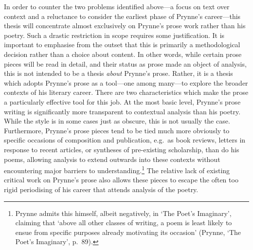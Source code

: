 \documentclass[]{article}
\begin{document}
In order to counter the two problems identified above---a focus on text
over context and a reluctance to consider the earliest phase of Prynne's
career---this thesis will concentrate almost exclusively on Prynne's
prose work rather than his poetry. Such a drastic restriction in scope
requires some justification. It is important to emphasise from the
outset that this is primarily a methodological decision rather than a
choice about content. In other words, while certain prose pieces will be
read in detail, and their status as prose made an object of analysis,
this is not intended to be a thesis \emph{about} Prynne's prose. Rather,
it is a thesis which adopts Prynne's prose as a tool---one among
many---to explore the broader contexts of his literary career. There are
two characteristics which make the prose a particularly effective tool
for this job. At the most basic level, Prynne's prose writing is
significantly more transparent to contextual analysis than his poetry.
While the style is in some cases just as obscure, this is not usually
the case. Furthermore, Prynne's prose pieces tend to be tied much more
obviously to specific occasions of composition and publication, e.g.~as
book reviews, letters in response to recent articles, or syntheses of
pre-existing scholarship, than do his poems, allowing analysis to extend
outwards into these contexts without encountering major barriers to
understanding.\footnote{Prynne admits this himself, albeit negatively,
  in `The Poet's Imaginary', claiming that `above all other classes of
  writing, a poem is least likely to ensue from specific purposes
  already motivating its occasion' (Prynne, `The Poet's Imaginary',
  p.~89).} The relative lack of existing critical work on Prynne's prose
also allows these pieces to escape the often too rigid periodising of
his career that attends analysis of the poetry.
\end{document}
